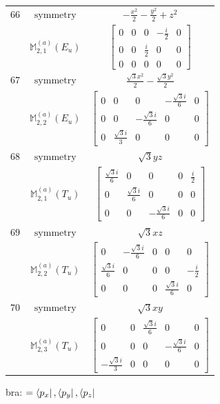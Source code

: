 \documentclass[fleqn,8pt,landscape]{jsarticle}
\begin{document}
\begin{longtable}{ccc}
$ 66 $ & $ \text{symmetry} $ & $ - \frac{x^{2}}{2} - \frac{y^{2}}{2} + z^{2} $ \\
$  $ & $ \mathbb{M}_{2,1}^{(a)}(E_{u}) $ & $ \begin{bmatrix} 0 & 0 & 0 & - \frac{i}{2} & 0 \\ 0 & 0 & \frac{i}{2} & 0 & 0 \\ 0 & 0 & 0 & 0 & 0 \end{bmatrix} $ \\ \hline
$ 67 $ & $ \text{symmetry} $ & $ \frac{\sqrt{3} x^{2}}{2} - \frac{\sqrt{3} y^{2}}{2} $ \\
$  $ & $ \mathbb{M}_{2,2}^{(a)}(E_{u}) $ & $ \begin{bmatrix} 0 & 0 & 0 & - \frac{\sqrt{3} i}{6} & 0 \\ 0 & 0 & - \frac{\sqrt{3} i}{6} & 0 & 0 \\ 0 & \frac{\sqrt{3} i}{3} & 0 & 0 & 0 \end{bmatrix} $ \\ \hline
$ 68 $ & $ \text{symmetry} $ & $ \sqrt{3} y z $ \\
$  $ & $ \mathbb{M}_{2,1}^{(a)}(T_{u}) $ & $ \begin{bmatrix} \frac{\sqrt{3} i}{6} & 0 & 0 & 0 & \frac{i}{2} \\ 0 & \frac{\sqrt{3} i}{6} & 0 & 0 & 0 \\ 0 & 0 & - \frac{\sqrt{3} i}{6} & 0 & 0 \end{bmatrix} $ \\ \hline
$ 69 $ & $ \text{symmetry} $ & $ \sqrt{3} x z $ \\
$  $ & $ \mathbb{M}_{2,2}^{(a)}(T_{u}) $ & $ \begin{bmatrix} 0 & - \frac{\sqrt{3} i}{6} & 0 & 0 & 0 \\ \frac{\sqrt{3} i}{6} & 0 & 0 & 0 & - \frac{i}{2} \\ 0 & 0 & 0 & \frac{\sqrt{3} i}{6} & 0 \end{bmatrix} $ \\ \hline
$ 70 $ & $ \text{symmetry} $ & $ \sqrt{3} x y $ \\
$  $ & $ \mathbb{M}_{2,3}^{(a)}(T_{u}) $ & $ \begin{bmatrix} 0 & 0 & \frac{\sqrt{3} i}{6} & 0 & 0 \\ 0 & 0 & 0 & - \frac{\sqrt{3} i}{6} & 0 \\ - \frac{\sqrt{3} i}{3} & 0 & 0 & 0 & 0 \end{bmatrix} $ \\ \hline
\end{longtable}
bra: $=\bra{p_{x}}, \bra{p_{y}}, \bra{p_{z}}$
\end{document}
